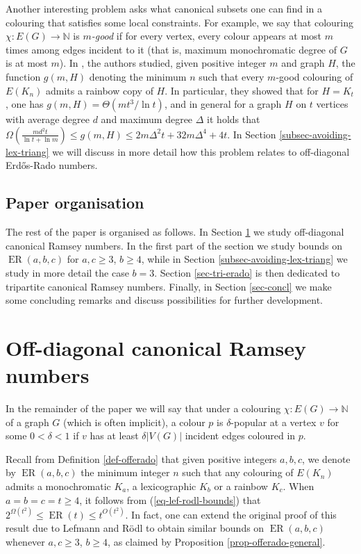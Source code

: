 \documentclass[11pt]{article}
\theoremstyle{plain}
\theoremstyle{definition}
\newcommand{\N}{\mathbb{N}}
\newcommand{\eradograph}[1]{\operatorname{ER}(#1)}
\newcommand{\offerado}[3]{\operatorname{ER}(#1,#2,#3)}
\begin{document}
Another interesting problem asks what canonical subsets one can find in a colouring that satisfies some local constraints. For example, we say that colouring $\chi:E(G)\to\N$ is \emph{$m$-good} if for every vertex, every colour appears at most $m$ times among edges incident to it (that is, maximum monochromatic degree of $G$ is at most $m$). In \cite{alon2003properly}, the authors studied, given positive integer $m$ and graph $H$, the function $g(m,H)$ denoting the minimum $n$ such that every $m$-good colouring of $E(K_n)$ admits a rainbow copy of $H$. In particular, they showed that for $H=K_t$, one has $g(m,H)=\Theta(mt^3/\ln t)$, and in general for a graph $H$ on $t$ vertices with average degree $d$ and maximum degree $\Delta$ it holds that $\Omega(\frac{md^2t}{\ln t+\ln m})\le g(m,H)\le 2m\Delta^2t+32m\Delta^4+4t$. In Section \ref{subsec-avoiding-lex-triang} we will discuss in more detail how this problem relates to off-diagonal Erd\H{o}s-Rado numbers.

\subsection{Paper organisation}\label{subsec-paper-org}

The rest of the paper is organised as follows. In Section \ref{sec-offerado} we study off-diagonal canonical Ramsey numbers. In the first part of the section we study bounds on $\offerado{a}{b}{c}$ for $a,c\ge 3$, $b\ge 4$, while in Section \ref{subsec-avoiding-lex-triang} we study in more detail the case $b=3$. Section \ref{sec-tri-erado} is then dedicated to tripartite canonical Ramsey numbers. Finally, in Section \ref{sec-concl} we make some concluding remarks and discuss possibilities for further development.


\section{Off-diagonal canonical Ramsey numbers}\label{sec-offerado}

In the remainder of the paper we will say that under a colouring $\chi:E(G)\to\N$ of a graph $G$ (which is often implicit), a colour $p$ is $\delta$-popular at a vertex $v$ for some $0<\delta<1$ if $v$ has at least $\delta|V(G)|$ incident edges coloured in $p$.

Recall from Definition \ref{def-offerado} that given positive integers $a,b,c$, we denote by $\offerado{a}{b}{c}$ the minimum integer $n$ such that any colouring of $E(K_n)$ admits a monochromatic $K_a$, a lexicographic $K_b$ or a rainbow $K_c$. When $a=b=c=t\ge 4$, it follows from (\ref{eq-lef-rodl-bounds}) that $2^{\Omega(t^2)}\le\eradograph{t}\le t^{O(t^2)}$. In fact, one can extend the original proof of this result due to Lefmann and R\"odl \cite{lefmann1995erdHos} to obtain similar bounds on $\offerado{a}{b}{c}$ whenever $a,c\ge3$, $b\ge4$, as claimed by Proposition \ref{prop-offerado-general}.
\end{document}
